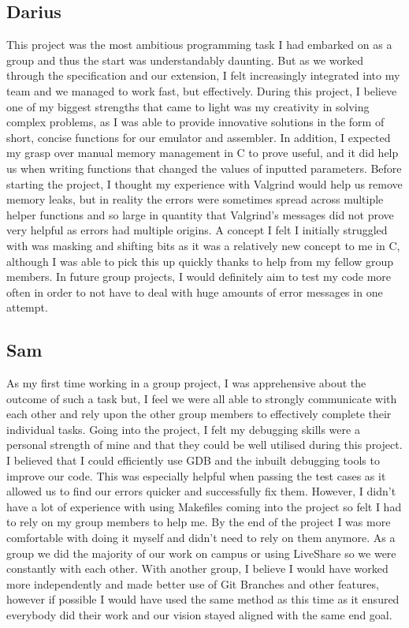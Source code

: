 \documentclass [10pt] {article}
\begin{document}
\subsection*{Darius}
This project was the most ambitious programming task I had embarked on as a group and thus the start was understandably daunting. But as we worked through the specification and our extension, I felt increasingly integrated into my team and we managed to work fast, but effectively. During this project, I believe one of my biggest strengths that came to light was my creativity in solving complex problems, as I was able to provide innovative solutions in the form of short, concise functions for our emulator and assembler. In addition, I expected my grasp over manual memory management in C to prove useful, and it did help us when writing functions that changed the values of inputted parameters. Before starting the project, I thought my experience with Valgrind would help us remove memory leaks, but in reality the errors were sometimes spread across multiple helper functions and so large in quantity that Valgrind’s messages did not prove very helpful as errors had multiple origins. A concept I felt I initially struggled with was masking and shifting bits as it was a relatively new concept to me in C, although I was able to pick this up quickly thanks to help from my fellow group members. In future group projects, I would definitely aim to test my code more often in order to not have to deal with huge amounts of error messages in one attempt. 

\subsection*{Sam}
As my first time working in a group project, I was apprehensive about the outcome of such a task but, I feel we were all able to strongly communicate with each other and rely upon the other group members to effectively complete their individual tasks. Going into the project, I felt my debugging skills were a personal strength of mine and that they could be well utilised during this project. I believed that I could efficiently use GDB and the inbuilt debugging tools to improve our code. This was especially helpful when passing the test cases as it allowed us to find our errors quicker and successfully fix them. However, I didn’t have a lot of experience with using Makefiles coming into the project so felt I had to rely on my group members to help me. By the end of the project I was more comfortable with doing it myself and didn’t need to rely on them anymore. As a group we did the majority of our work on campus or using LiveShare so we were constantly with each other. With another group, I believe I would have worked more independently and made better use of Git Branches and other features, however if possible I would have used the same method as this time as it ensured everybody did their work and our vision stayed aligned with the same end goal.
\end{document}
